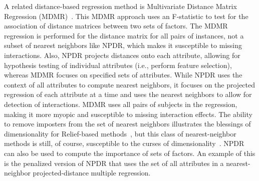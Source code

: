 \documentclass[10pt]{article}
\begin{document}


A related distance-based regression method is Multivariate Distance Matrix Regression (MDMR)~\cite{schork12}. This MDMR approach uses an F-statistic to test for the association of distance matrices between two sets of factors. The MDMR regression is performed for the distance matrix for all pairs of instances, not a subset of nearest neighbors like NPDR, which makes it susceptible to missing interactions. Also, NPDR projects distances onto each attribute, allowing for hypothesis testing of individual attributes (i.e., perform feature selection), whereas MDMR focuses on specified sets of attributes. While NPDR uses the context of all attributes to compute nearest neighbors, it focuses on the projected regression of each attribute at a time and uses the nearest neighbors to allow for detection of interactions. MDMR uses all pairs of subjects in the regression, making it more myopic and susceptible to missing interaction effects. The ability to remove imposters from the set of nearest neighbors illustrates the blessings of dimensionality for Relief-based methods~\cite{bod}, but this class of nearest-neighbor methods is still, of course, susceptible to the curses of dimensionality~\cite{CoD}. NPDR can also be used to compute the importance of sets of factors. An example of this is the penalized version of NPDR that uses the set of all attributes in a nearest-neighbor projected-distance multiple regression.
\end{document}

